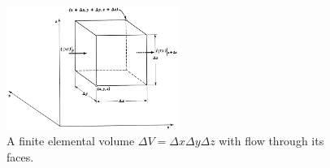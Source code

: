 \documentclass[twoside,11pt]		{report}
\begin{document}
\begin{figure}
\begin{center}
\includegraphics[width=0.5\textwidth]{BSL-3.1-1.eps}
\end{center}
\caption{A  finite elemental volume $\Delta V=\Delta x\Delta y\Delta z$
with flow through its faces.}
\label{fig.massV}
\end{figure}
\end{document}
